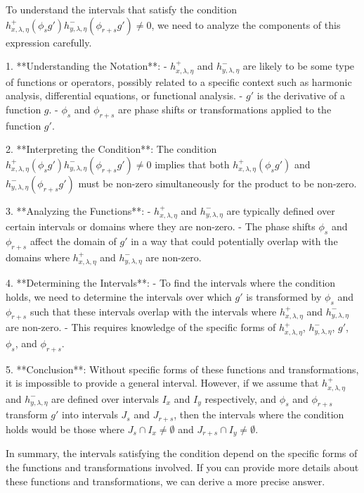 To understand the intervals that satisfy the condition \( h_{x,\lambda,\eta}^+(\phi_s g') h_{y,\lambda,\eta}^-( \phi_{r+s}g') \neq 0 \), we need to analyze the components of this expression carefully.

1. **Understanding the Notation**:
   - \( h_{x,\lambda,\eta}^+ \) and \( h_{y,\lambda,\eta}^- \) are likely to be some type of functions or operators, possibly related to a specific context such as harmonic analysis, differential equations, or functional analysis.
   - \( g' \) is the derivative of a function \( g \).
   - \( \phi_s \) and \( \phi_{r+s} \) are phase shifts or transformations applied to the function \( g' \).

2. **Interpreting the Condition**:
   The condition \( h_{x,\lambda,\eta}^+(\phi_s g') h_{y,\lambda,\eta}^-( \phi_{r+s}g') \neq 0 \) implies that both \( h_{x,\lambda,\eta}^+(\phi_s g') \) and \( h_{y,\lambda,\eta}^-( \phi_{r+s}g') \) must be non-zero simultaneously for the product to be non-zero.

3. **Analyzing the Functions**:
   - \( h_{x,\lambda,\eta}^+ \) and \( h_{y,\lambda,\eta}^- \) are typically defined over certain intervals or domains where they are non-zero.
   - The phase shifts \( \phi_s \) and \( \phi_{r+s} \) affect the domain of \( g' \) in a way that could potentially overlap with the domains where \( h_{x,\lambda,\eta}^+ \) and \( h_{y,\lambda,\eta}^- \) are non-zero.

4. **Determining the Intervals**:
   - To find the intervals where the condition holds, we need to determine the intervals over which \( g' \) is transformed by \( \phi_s \) and \( \phi_{r+s} \) such that these intervals overlap with the intervals where \( h_{x,\lambda,\eta}^+ \) and \( h_{y,\lambda,\eta}^- \) are non-zero.
   - This requires knowledge of the specific forms of \( h_{x,\lambda,\eta}^+ \), \( h_{y,\lambda,\eta}^- \), \( g' \), \( \phi_s \), and \( \phi_{r+s} \).

5. **Conclusion**:
   Without specific forms of these functions and transformations, it is impossible to provide a general interval. However, if we assume that \( h_{x,\lambda,\eta}^+ \) and \( h_{y,\lambda,\eta}^- \) are defined over intervals \( I_x \) and \( I_y \) respectively, and \( \phi_s \) and \( \phi_{r+s} \) transform \( g' \) into intervals \( J_s \) and \( J_{r+s} \), then the intervals where the condition holds would be those where \( J_s \cap I_x \neq \emptyset \) and \( J_{r+s} \cap I_y \neq \emptyset \).

In summary, the intervals satisfying the condition depend on the specific forms of the functions and transformations involved. If you can provide more details about these functions and transformations, we can derive a more precise answer.